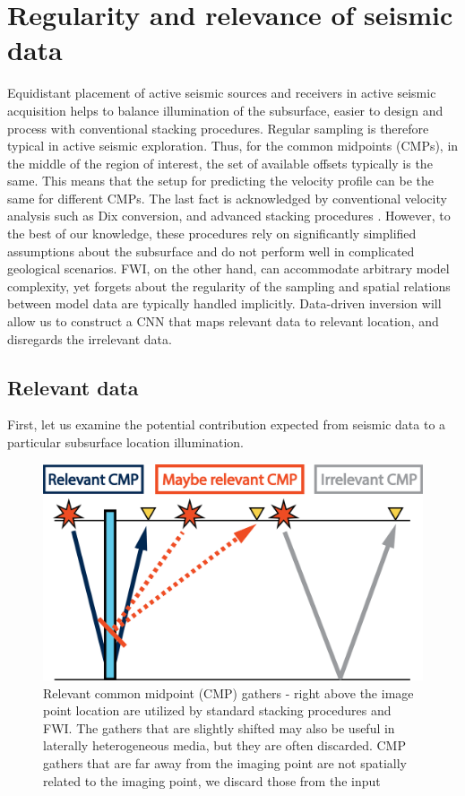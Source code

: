 \documentclass[paper,twocolomn]{geophysics}
\begin{document}
\section{Regularity and relevance of seismic data}
Equidistant placement of active seismic sources and receivers in active seismic acquisition helps to balance illumination of the subsurface, easier to design and process with conventional stacking procedures. Regular sampling is therefore typical in active seismic exploration. Thus, for the common midpoints (CMPs), in the middle of the region of interest, the set of available offsets typically is the same.
This means that the setup for predicting the velocity profile can be the same for different CMPs.
The last fact is acknowledged by conventional velocity analysis such as Dix conversion, and advanced stacking procedures \citep{mann1999common}. However, to the best of our knowledge, these procedures rely on significantly simplified assumptions about the subsurface and do not perform well in complicated geological scenarios.
FWI, on the other hand, can accommodate arbitrary model complexity, yet forgets about the regularity of the sampling and spatial relations between model data are typically handled implicitly. Data-driven inversion will allow us to construct a CNN that maps relevant data to relevant location, and disregards the irrelevant data.  

\subsection{Relevant data}

First, let us examine the potential contribution expected from seismic data to a particular subsurface location illumination.

\begin{figure}[h!]
	\centering
	\includegraphics[width=0.7\linewidth]{Fig/relevantCMP}
	\caption{Relevant common midpoint (CMP) gathers - right above the image point location are utilized by standard stacking procedures and FWI. The gathers that are slightly shifted may also be useful in laterally heterogeneous media, but they are often discarded. CMP gathers that are far away from the imaging point are not spatially related to the imaging point, we discard those from the input}
	\label{fig:relevantCMP}
\end{figure}
\end{document}
